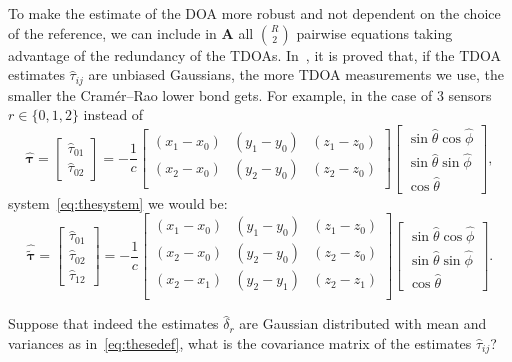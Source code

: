 \noindent
To make the estimate of the DOA more robust and not dependent on the choice of the reference, we can include in \(\mathbf{A}\) all \(\binom{R}{2}\) pairwise equations taking advantage of the redundancy of the TDOAs. In~\cite{yang2005cramer}, it is proved that, if the TDOA estimates \(\hat{\tau}_{ij}\) are unbiased Gaussians, the more TDOA measurements we use, the smaller
the Cramér–Rao lower bond gets. For example, in the case of 3 sensors \(r\in\{0,1,2\}\) instead of  
\begin{equation}
\hat{\boldsymbol{\tau}}=
\left[\begin{array}{c}
\hat{\tau}_{01} \\
\hat{\tau}_{02}
\end{array}\right]
 = -\frac{1}{c} \left[\begin{array}{ccc}
(x_1-x_0) & (y_1-y_0) & (z_1-z_0) \\
(x_2-x_0) & (y_2-y_0) & (z_2-z_0) \\
\end{array}\right] \left[\begin{array}{c}
\sin \hat{\theta} \cos \hat{\phi} \\
\sin \hat{\theta} \sin \hat{\phi} \\
\cos \hat{\theta}
\end{array}\right],
\end{equation}
system~\eqref{eq:thesystem} we would be:
\begin{equation}
\hat{\boldsymbol{\tilde{\tau}}}=
\left[\begin{array}{c}
\hat{\tau}_{01} \\
\hat{\tau}_{02} \\
\hat{\tau}_{12}
\end{array}\right]
 = -\frac{1}{c} \left[\begin{array}{ccc}
(x_1-x_0) & (y_1-y_0) & (z_1-z_0) \\
(x_2-x_0) & (y_2-y_0) & (z_2-z_0) \\
(x_2-x_1) & (y_2-y_1) & (z_2-z_1) \\
\end{array}\right] \left[\begin{array}{c}
\sin \hat{\theta} \cos \hat{\phi} \\
\sin \hat{\theta} \sin \hat{\phi} \\
\cos \hat{\theta}
\end{array}\right].
\end{equation}

\noindent
Suppose that indeed the estimates \(\hat{\delta}_r\) are Gaussian distributed with mean and variances as in~\eqref{eq:thesedef}, what is the covariance matrix of the estimates \(\hat{\tau}_{ij}\)?

